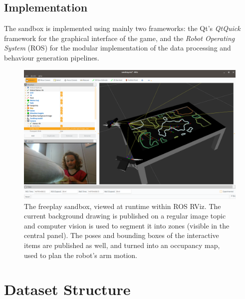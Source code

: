 \documentclass{article}
\begin{document}
\subsection{Implementation}

The sandbox is implemented using mainly two frameworks: the Qt's \emph{QtQuick} framework
for the graphical interface of the game, and the \emph{Robot Operating System}
(ROS) for the modular implementation of the data processing and behaviour
generation pipelines.

\begin{figure}
    \centering
    \includegraphics[width=0.9\linewidth]{rviz-sandtray}
    \caption{The freeplay sandbox, viewed at runtime within ROS RViz. The
    current background drawing is published on a regular image
    topic and computer vision is used to segment it into zones (visible in
    the central panel). The poses and bounding boxes of the interactive items
    are published as well, and turned into an occupancy map, used to plan the
    robot's arm motion.}
    \label{fig|rviz}
\end{figure}

\section{Dataset Structure}
\end{document}
